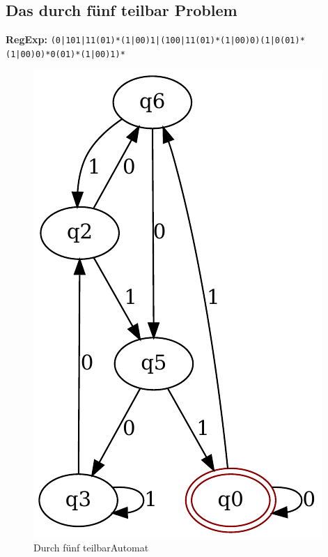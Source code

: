 \subsection{Das durch fünf teilbar Problem}
\textbf{RegExp:} \lstinline$(0|101|11(01)*(1|00)1|(100|11(01)*(1|00)0)(1|0(01)*(1|00)0)*0(01)*(1|00)1)*$
\begin{figure}[H]
  \centering
  \includegraphics{images/div5_automat.pdf}
  \caption[\flqq Durch fünf teilbar\frqq Automat]{\flqq Durch fünf teilbar\frqq Automat}
  \label{fig:div3_automat}
\end{figure}
